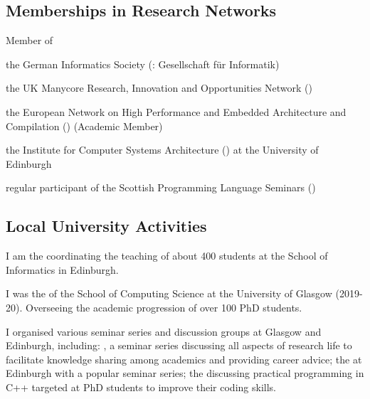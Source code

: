\subsection{Memberships in Research Networks}
\begin{cvitemize}
    \item Member of
      \begin{inlineItemize}
        \item {}
        \item the German Informatics Society (\@: {\footnotesize Gesellschaft für Informatik})
        \item the UK Manycore Research, Innovation and Opportunities Network ()
        \item the European Network on High Performance and Embedded Architecture and Compilation () (Academic Member)
        \item the Institute for Computer Systems Architecture () at the University of Edinburgh
        \item regular participant of the Scottish Programming Language Seminars ()
      \end{inlineItemize}
\end{cvitemize}

\subsection{Local University Activities}
\begin{cvitemize}
  \item I am the  coordinating the teaching of about 400 students at the School of Informatics in Edinburgh.
\end{cvitemize}
\begin{cvitemize}
  \item I was the  of the School of Computing Science at the University of Glasgow ({\small 2019-20}).
        Overseeing the academic progression of over 100 PhD students.
\end{cvitemize}
\begin{cvitemize}
  \item I organised various seminar series and discussion groups at Glasgow and Edinburgh, including: , a seminar series discussing all aspects of research life to facilitate knowledge sharing among academics and providing career advice; the  at Edinburgh with a popular seminar series; the  discussing practical programming in C++ targeted at PhD students to improve their coding skills.
\end{cvitemize}

